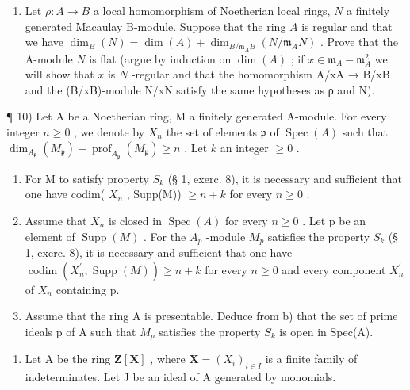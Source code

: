 \begin{enumerate}
\def\labelenumi{\arabic{enumi})}
\setcounter{enumi}{8}
\tightlist
\item
  Let \(\rho: A \to B\) a local homomorphism of Noetherian local rings, \(N\) a finitely generated Macaulay B-module. Suppose that the ring \(A\) is regular and that we have \(\dim_{B}(N) = \dim(A) + \dim_{B/\mathfrak{m}_{A}B}(N/\mathfrak{m}_{A}N)\) . Prove that the A-module \(N\) is flat (argue by induction on \(\dim(A)\) ; if \(x \in \mathfrak{m}_{A} - \mathfrak{m}_{A}^{2}\) we will show that \(x\) is \(N\) -regular and that the homomorphism A/xA → B/xB and the (B/xB)-module N/xN satisfy the same hypotheses as ρ and N).
\end{enumerate}

¶ 10) Let A be a Noetherian ring, M a finitely generated A-module. For every integer \(n \geqslant 0\) , we denote by \(X_{n}\) the set of elements \(\mathfrak{p}\) of \(\operatorname{Spec}(A)\) such that \(\dim_{A_{\mathfrak{p}}}(M_{\mathfrak{p}}) - \operatorname{prof}_{A_{\mathfrak{p}}}(M_{\mathfrak{p}}) \geqslant n\) . Let \(k\) an integer \(\geqslant 0\) .

\begin{enumerate}
\def\labelenumi{\alph{enumi})}
\item
  For M to satisfy property \(S_{k}\) (§ 1, exerc. 8), it is necessary and sufficient that one have codim( \(X_{n}\) , Supp(M)) \(\geqslant n + k\) for every \(n \geqslant 0\) .
\item
  Assume that \(X_{n}\) is closed in \(\operatorname{Spec}(A)\) for every \(n \geqslant 0\) . Let p be an element of \(\operatorname{Supp}(M)\) . For the \(A_{p}\) -module \(M_{p}\) satisfies the property \(S_{k}\) (§ 1, exerc. 8), it is necessary and sufficient that one have \(\operatorname{codim}(X_{n}^{\prime}, \operatorname{Supp}(M)) \geqslant n + k\) for every \(n \geqslant 0\) and every component \(X_{n}^{\prime}\) of \(X_{n}\) containing p.
\item
  Assume that the ring A is presentable. Deduce from b) that the set of prime ideals p of A such that \(M_{p}\) satisfies the property \(S_{k}\) is open in Spec(A).
\end{enumerate}

\begin{enumerate}
\def\labelenumi{\arabic{enumi})}
\setcounter{enumi}{10}
\tightlist
\item
  Let A be the ring \(\mathbf{Z}[\mathbf{X}]\) , where \(\mathbf{X} = (X_i)_{i\in I}\) is a finite family of indeterminates. Let J be an ideal of A generated by monomials.
\end{enumerate}

